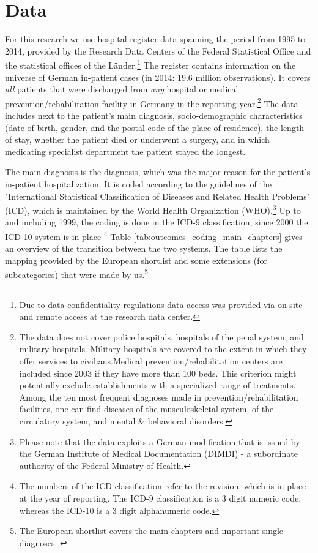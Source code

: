 \documentclass[11pt, a4paper,draft]{article} %
\begin{document}
\section{Data}\label{sec:data}
For this research we use hospital register data spanning the period from 1995 to 2014, provided by the Research Data Centers of the Federal Statistical Office and the statistical offices of the Länder.\footnote{Due to data confidentiality regulations data access was provided via on-site and remote access at the research data center.} The register contains information on the universe of German in-patient cases (in 2014: 19.6 million observations). It covers \textit{all} patients that were discharged from \textit{any} hospital or medical prevention/rehabilitation facility in Germany in the reporting year.\footnote{The data does not cover police hospitals, hospitals of the penal system, and military hospitals. Military hospitals are covered to the extent in which they offer services to civilians.\newline Medical prevention/rehabilitation centers are included since 2003 if they have more than 100 beds. This criterion might potentially exclude establishments with a specialized range of treatments. Among the ten most frequent diagnoses made in prevention/rehabilitation facilities, one can find diseases of the musculoskeletal system, of the circulatory system, and mental \& behavioral disorders.} The data includes next to the patient's main diagnosis, socio-demographic characteristics (date of birth, gender, and the postal code of the place of residence), the length of stay, whether the patient died or underwent a surgery, and in which medicating specialist department the patient stayed the longest.\newline 

The main diagnosis is the diagnosis, which was the major reason for the patient's in-patient hospitalization. It is coded according to the guidelines of the "International Statistical Classification of Diseases and Related Health Problems" (ICD), which is maintained by the World Health Organization (WHO).\footnote{Please note that the data exploits a German modification that is issued by the German Institute of Medical Documentation (DIMDI) - a subordinate authority of the Federal Ministry of Health.} Up to and including 1999, the coding is done in the ICD-9 classification, since 2000 the ICD-10 system is in place \footnote{The numbers of the ICD classification refer to the revision, which is in place at the year of reporting. The ICD-9 classification is a 3 digit numeric code, whereas the ICD-10 is a 3 digit alphanumeric code.} Table \ref{tab:outcomes_coding_main_chapters} gives an overview of the transition between the two systems. The table lists the mapping provided by the European shortlist and some extensions (for subcategories) that were made by us.\footnote{The European shortlist covers the main chapters and important single diagnoses \citep[p. 76]{statistisches2012diagnosedaten}.}\newline
\end{document}
